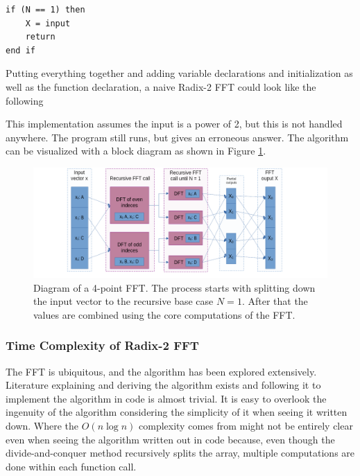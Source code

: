 \begin{lstlisting}    
if (N == 1) then
    X = input
    return
end if
\end{lstlisting}

Putting everything together and adding variable declarations and initialization as well as the function declaration, a naive Radix-2 FFT could look like the following



This implementation assumes the input is a power of 2, but this is not handled anywhere. The program still runs, but gives an erroneous answer. The algorithm can be visualized with a block diagram as shown in Figure \ref{fig:FFT-Alg}.

\begin{figure}[ht]
    \centering
    \includegraphics[width=\textwidth]{./images/fft.png}
    \caption{Diagram of a 4-point FFT. The process starts with splitting down the input vector to the recursive base case $N=1$. After that the values are combined using the core computations of the FFT.\label{fig:FFT-Alg}}
\end{figure}

\subsubsection{Time Complexity of Radix-2 FFT}
The FFT is ubiquitous, and the algorithm has been explored extensively. Literature explaining and deriving the algorithm exists and following it to implement the algorithm in code is almost trivial. It is easy to overlook the ingenuity of the algorithm considering the simplicity of it when seeing it written down. Where the $O(n\log n)$ complexity comes from might not be entirely clear even when seeing the algorithm written out in code because, even though the divide-and-conquer method recursively splits the array, multiple computations are done within each function call. 

